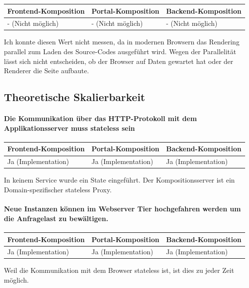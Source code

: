 \begin{tabularx}{\linewidth}{| Y | Y | Y |}
    \hline
    Frontend-Komposition & Portal-Komposition & Backend-Komposition
    \\ \hline
    - (Nicht möglich) & - (Nicht möglich) & - (Nicht möglich) \\ \hline
\end{tabularx}

Ich konnte diesen Wert nicht messen, da in modernen Browsern das Rendering parallel zum Laden des Source-Codes ausgeführt wird. Wegen der Parallelität lässt sich nicht entscheiden, ob der Browser auf Daten gewartet hat oder der Renderer die Seite aufbaute.

\subsection{Theoretische Skalierbarkeit}

\paragraph{Die Kommunikation über das HTTP-Protokoll mit dem Applikationsserver muss stateless sein}

\begin{tabularx}{\linewidth}{| Y | Y | Y |}
    \hline
    Frontend-Komposition & Portal-Komposition & Backend-Komposition
    \\ \hline
    Ja (Implementation) & Ja (Implementation) & Ja (Implementation) \\ \hline
\end{tabularx}

In keinem Service wurde ein State eingeführt. Der Kompositionsserver ist ein Domain-spezifischer stateless Proxy.

\paragraph{Neue Instanzen können im Webserver Tier hochgefahren werden um die Anfragelast zu bewältigen.}

\begin{tabularx}{\linewidth}{| Y | Y | Y |}
    \hline
    Frontend-Komposition & Portal-Komposition & Backend-Komposition
    \\ \hline
    Ja (Implementation) & Ja (Implementation) & Ja (Implementation) 
    \\ \hline
\end{tabularx}

Weil die Kommunikation mit dem Browser stateless ist, ist dies zu jeder Zeit möglich.

